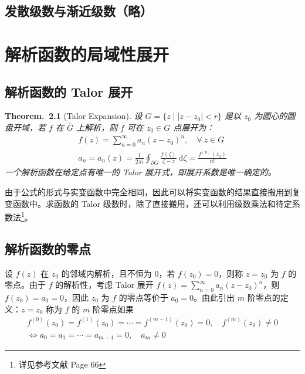 \documentclass[UTF8]{report}
\theoremstyle{MyLineTheoremStyle} %
\theoremstyle{MyBlockTheoremStyle} %
\newtheorem{BlockTheorem}[LineTheorem]{Theorem.\,} %
\theoremstyle{MySubsubsectionStyle} %
\begin{document}
\section{发散级数与渐近级数（略）}

\chapter{解析函数的局域性展开}\thispagestyle{fancy}

\section{解析函数的 Talor 展开}

\begin{BlockTheorem}[Talor Expansion]\label{Talor Expansion}
设 $G = \{z \mid \left| z - z_0 \right| < r  \}$ 是以 $z_0$ 为圆心的圆盘开域，若 $f$ 在 $\overline{G}$ 上解析，则 $f$ 可在 $z_0 \in G$ 点展开为：
\begin{gather}
    f(z) = \sum_{n = 0}^{\infty} a_n (z - z_0)^n,\quad  \forall\ z \in G
    \\ 
    a_n = a_n(z) =\frac{1}{2 \pi i} \oint_{\partial G} \frac{f(\zeta)}{\zeta - z} \ \mathrm{d}\zeta  =  \frac{f^{(n)}(z_0)}{n!}
\end{gather}
一个解析函数在给定点有唯一的 Talor 展开式，即展开系数是唯一确定的。
\end{BlockTheorem}
由于公式的形式与实变函数中完全相同，因此可以将实变函数的结果直接搬用到复变函数中。求函数的 Talor 级数时，除了直接搬用，还可以利用级数乘法和待定系数法\footnote{详见参考文献 \cite{数学物理方法} Page 66}。

\section{解析函数的零点}

设 $f(z)$ 在 $z_0$ 的邻域内解析，且不恒为 0，若 $f(z_0) = 0$，则称 $z = z_0$ 为 $f$ 的零点。由于 $f$ 的解析性，考虑 Talor 展开 $f(z) = \sum_{n = 0}^{\infty} a_n (z - z_0)^n$，则 $f(z_0) = a_0 = 0$，因此 $z_0$ 为 $f$ 的零点等价于 $a_0 = 0$。由此引出 $m$ 阶零点的定义：$z = z_0$ 称为 $f$ 的 $m$ 阶零点如果
\begin{gather}
f^{(0)}(z_0) = f^{(1)}(z_0) = \cdots = f^{(m-1)}(z_0) = 0,\quad f^{(m)}(z_0) \ne 0 \\ 
\Longleftrightarrow a_0 = a_1 = \cdots = a_{m-1} = 0,\quad a_m \ne 0
\end{gather}
\end{document}
